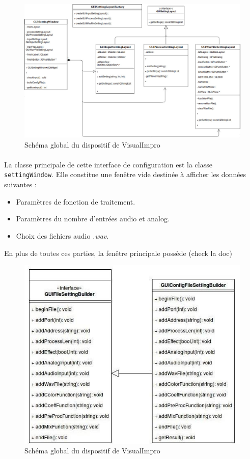 \begin{figure}[h]
 \centering
 \includegraphics[scale=0.3]{assets/umlSettingWindow.png}
 \caption{Schéma global du dispositif de VisualImpro}
 \label{schéma global}
\end{figure}

\paragraph{}
La classe principale de cette interface de configuration est la
classe \verb!settingWindow!. Elle constitue une fenêtre vide
destinée à afficher les données suivantes :
\begin{itemize}
 \item Paramètres de fonction de traitement.
 \item Paramètres du nombre d'entrées audio et analog.
 \item Choix des fichiers audio \textit{.wav}.
\end{itemize}
En plus de toutes ces parties, la fenêtre principale possède (check la doc)

\begin{figure}[h]
 \centering
 \includegraphics[scale=0.5]{assets/umlBuilder.png}
 \caption{Schéma global du dispositif de VisualImpro}
 \label{schéma global}
\end{figure}

